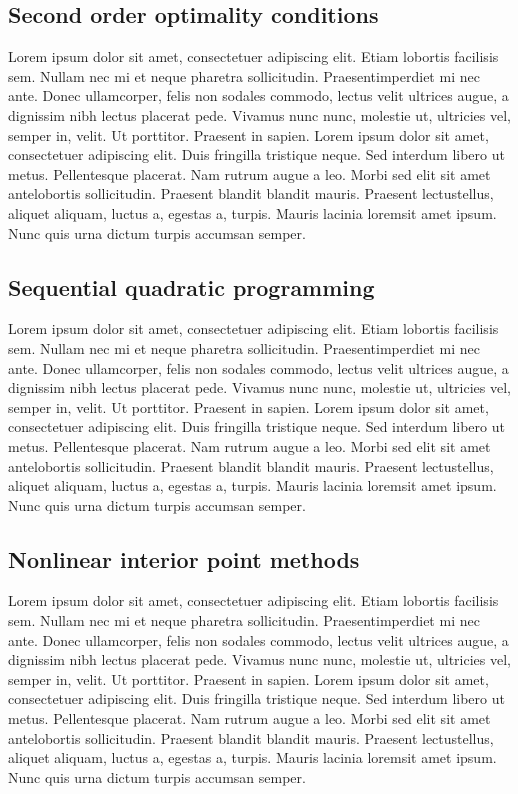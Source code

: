 \subsection{Second order optimality conditions}

Lorem ipsum dolor sit amet, consectetuer adipiscing elit. Etiam lobortis facilisis sem. Nullam nec mi et neque pharetra sollicitudin. Praesentimperdiet mi nec ante. Donec ullamcorper, felis non sodales commodo, lectus velit ultrices augue, a dignissim nibh lectus placerat pede. Vivamus nunc nunc, molestie ut, ultricies vel, semper in, velit. Ut porttitor. Praesent in sapien. Lorem ipsum dolor sit amet, consectetuer adipiscing elit. Duis fringilla tristique neque. Sed interdum libero ut metus. Pellentesque placerat. Nam rutrum augue a leo. Morbi sed elit sit amet antelobortis sollicitudin. Praesent blandit blandit mauris. Praesent lectustellus, aliquet aliquam, luctus a, egestas a, turpis. Mauris lacinia loremsit amet ipsum. Nunc quis urna dictum turpis accumsan semper.

\subsection{Sequential quadratic programming}

Lorem ipsum dolor sit amet, consectetuer adipiscing elit. Etiam lobortis facilisis sem. Nullam nec mi et neque pharetra sollicitudin. Praesentimperdiet mi nec ante. Donec ullamcorper, felis non sodales commodo, lectus velit ultrices augue, a dignissim nibh lectus placerat pede. Vivamus nunc nunc, molestie ut, ultricies vel, semper in, velit. Ut porttitor. Praesent in sapien. Lorem ipsum dolor sit amet, consectetuer adipiscing elit. Duis fringilla tristique neque. Sed interdum libero ut metus. Pellentesque placerat. Nam rutrum augue a leo. Morbi sed elit sit amet antelobortis sollicitudin. Praesent blandit blandit mauris. Praesent lectustellus, aliquet aliquam, luctus a, egestas a, turpis. Mauris lacinia loremsit amet ipsum. Nunc quis urna dictum turpis accumsan semper.

\subsection{Nonlinear interior point methods}

Lorem ipsum dolor sit amet, consectetuer adipiscing elit. Etiam lobortis facilisis sem. Nullam nec mi et neque pharetra sollicitudin. Praesentimperdiet mi nec ante. Donec ullamcorper, felis non sodales commodo, lectus velit ultrices augue, a dignissim nibh lectus placerat pede. Vivamus nunc nunc, molestie ut, ultricies vel, semper in, velit. Ut porttitor. Praesent in sapien. Lorem ipsum dolor sit amet, consectetuer adipiscing elit. Duis fringilla tristique neque. Sed interdum libero ut metus. Pellentesque placerat. Nam rutrum augue a leo. Morbi sed elit sit amet antelobortis sollicitudin. Praesent blandit blandit mauris. Praesent lectustellus, aliquet aliquam, luctus a, egestas a, turpis. Mauris lacinia loremsit amet ipsum. Nunc quis urna dictum turpis accumsan semper.


